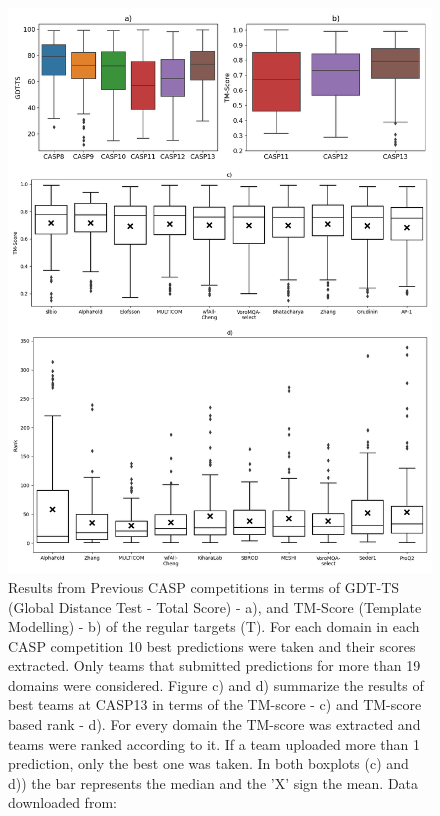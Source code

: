 \begin{figure}
    \centering
    \includegraphics[scale=0.47]{imgs_tomas/casp_analysis_bw.png}
    \caption{Results from Previous CASP competitions in terms of GDT-TS (Global Distance Test - Total Score) - a), and TM-Score (Template Modelling) - b) of the regular targets (T). For each domain in each CASP competition 10 best predictions were taken and their scores extracted. Only teams that submitted predictions for more than 19 domains were considered.
    Figure c) and d) summarize the results of best teams at CASP13 in terms of the TM-score - c) and TM-score based rank - d). For every domain the TM-score was extracted and teams were ranked according to it. If a team uploaded more than 1 prediction, only the best one was taken. In both boxplots (c) and d)) the bar represents the median and the 'X' sign the mean. Data downloaded from: \cite{casp}}
    \label{fig:casp}
\end{figure}

